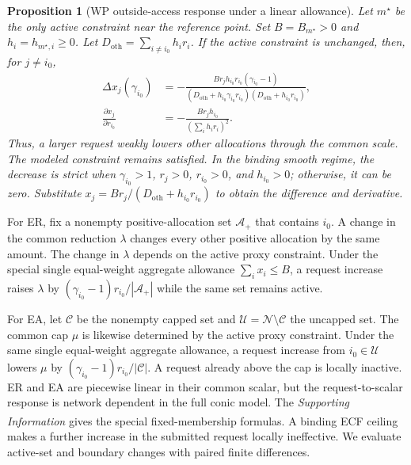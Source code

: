 \documentclass[twoside,twocolumn,9pt]{article}
\newtheorem{proposition}{Proposition}[section]
\newcommand{\suppref}{\textit{Supporting Information}\textsuperscript{\dag}}
\begin{document}
{\begin{proposition}[WP outside-access response under a linear allowance]
\label{prop:weighted_denominator}
Let $m^\star$ be the only active constraint near the reference point. Set
$B=B_{m^\star}>0$ and $h_i=h_{m^\star,i}\ge0$. Let
$D_{\mathrm{oth}}=\sum_{i\ne i_0}h_ir_i$. If the active constraint is unchanged,
then, for $j\ne i_0$,
\begin{equation}
\begin{aligned}
\Delta x_j(\gamma_{i_0})
&=-\frac{B r_jh_{i_0}r_{i_0}(\gamma_{i_0}-1)}
{(D_{\mathrm{oth}}+h_{i_0}\gamma_{i_0}r_{i_0})
 (D_{\mathrm{oth}}+h_{i_0}r_{i_0})},\\
\frac{\partial x_j}{\partial r_{i_0}}
&=-\frac{Br_jh_{i_0}}{(\sum_i h_ir_i)^2}.
\end{aligned}
\label{eq:wp_response_summary}
\end{equation}
Thus, a larger request weakly lowers other allocations through the common
scale. The modeled constraint remains satisfied. In the binding smooth regime,
the decrease is strict when $\gamma_{i_0}>1$, $r_j>0$, $r_{i_0}>0$, and
$h_{i_0}>0$; otherwise, it can be zero. Substitute
$x_j=Br_j/(D_{\mathrm{oth}}+h_{i_0}r_{i_0})$ to obtain the difference and
derivative.
\end{proposition}
For ER, fix a nonempty positive-allocation set $\mathcal A_+$ that contains
$i_0$. A change in the common reduction $\lambda$ changes every other positive
allocation by the same amount. The change in $\lambda$ depends on the active
proxy constraint. Under the special single equal-weight aggregate allowance
$\sum_i x_i\le B$, a request increase raises $\lambda$ by
$(\gamma_{i_0}-1)r_{i_0}/|\mathcal A_+|$ while the same set remains active.

For EA, let $\mathcal C$ be the nonempty capped set and
$\mathcal U=\mathcal N\setminus\mathcal C$ the uncapped set. The common cap
$\mu$ is likewise determined by the active proxy constraint. Under the same
single equal-weight aggregate allowance, a request increase from
$i_0\in\mathcal U$ lowers $\mu$ by
$(\gamma_{i_0}-1)r_{i_0}/|\mathcal C|$. A request already above the cap is
locally inactive. ER and EA are piecewise linear in their common scalar, but the
request-to-scalar response is network dependent in the full conic model. The
\suppref{} gives the special fixed-membership formulas. A binding ECF ceiling
makes a further increase in the submitted request locally ineffective. We
evaluate active-set and boundary changes with paired finite differences.

}
\end{document}
